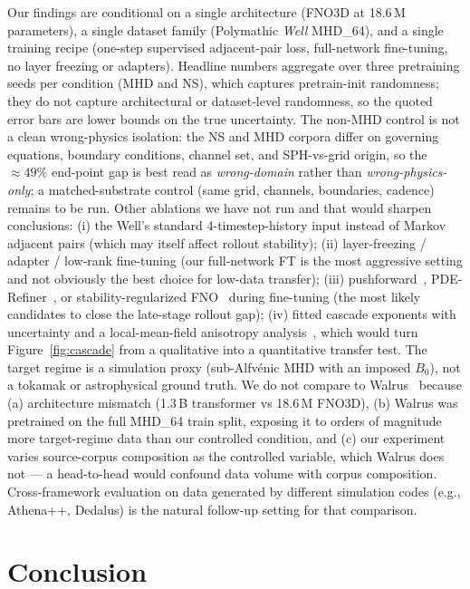 \documentclass{article}
\begin{document}
Our findings are conditional on a single architecture (FNO3D at 18.6\,M parameters), a single dataset family (Polymathic \emph{Well} MHD\_64), and a single training recipe (one-step supervised adjacent-pair loss, full-network fine-tuning, no layer freezing or adapters). Headline numbers aggregate over three pretraining seeds per condition (MHD and NS), which captures pretrain-init randomness; they do not capture architectural or dataset-level randomness, so the quoted error bars are lower bounds on the true uncertainty. The non-MHD control is not a clean wrong-physics isolation: the NS and MHD corpora differ on governing equations, boundary conditions, channel set, and SPH-vs-grid origin, so the $\approx 49\%$ end-point gap is best read as \emph{wrong-domain} rather than \emph{wrong-physics-only}; a matched-substrate control (same grid, channels, boundaries, cadence) remains to be run. Other ablations we have not run and that would sharpen conclusions: (i) the Well's standard 4-timestep-history input instead of Markov adjacent pairs (which may itself affect rollout stability); (ii) layer-freezing / adapter / low-rank fine-tuning (our full-network FT is the most aggressive setting and not obviously the best choice for low-data transfer); (iii) pushforward~\cite{brandstetter2022pushforward}, PDE-Refiner~\cite{lippe2023pderefiner}, or stability-regularized FNO~\cite{mccabe2023stability} during fine-tuning (the most likely candidates to close the late-stage rollout gap); (iv) fitted cascade exponents with uncertainty and a local-mean-field anisotropy analysis~\cite{chovishniac2000,schekochihin2022mhdturb}, which would turn Figure~\ref{fig:cascade} from a qualitative into a quantitative transfer test. The target regime is a simulation proxy (sub-Alfv\'enic MHD with an imposed $B_0$), not a tokamak or astrophysical ground truth. We do not compare to Walrus~\cite{mccabe2025walrus} because (a) architecture mismatch (1.3\,B transformer vs 18.6\,M FNO3D), (b) Walrus was pretrained on the full MHD\_64 train split, exposing it to orders of magnitude more target-regime data than our controlled condition, and (c) our experiment varies source-corpus composition as the controlled variable, which Walrus does not --- a head-to-head would confound data volume with corpus composition. Cross-framework evaluation on data generated by different simulation codes (e.g., Athena++, Dedalus) is the natural follow-up setting for that comparison.

\section{Conclusion}
\end{document}
